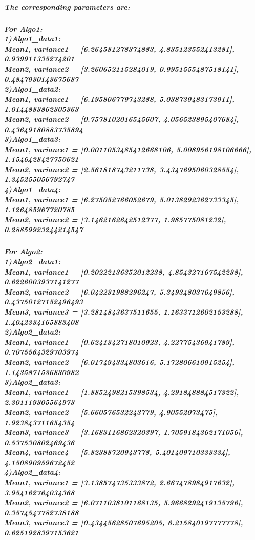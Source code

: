 \documentclass{article}
\begin{document}
\subparagraph{
The corresponding parameters are:
}
\subparagraph{
For \textit{Algo1}:\\
1)\textit{Algo1\_data1}:\\
Mean1, variance1 = [6.264581278374883, 4.835123552413281], 0.939911335274201\\
Mean2, variance2 = [3.260652115284019, 0.9951555487518141], 0.4847930143675687\\
2)\textit{Algo1\_data2}:\\
Mean1, variance1 = [6.195806779743288, 5.038739483173911], 1.0144883862305363\\
Mean2, variance2 = [0.7578102016545607, 4.056523895407684], 0.43649180883735894\\
3)\textit{Algo1\_data3}:\\
Mean1, variance1 = [0.0011053485412668106, 5.008956198106666], 1.1546428427750621\\
Mean2, variance2 = [2.561818743211738, 3.4347695060328554], 1.345255056792747\\
4)\textit{Algo1\_data4}:\\
Mean1, variance1 = [6.275052766052679, 5.0138292362733345], 1.126485967720785\\
Mean2, variance2 = [3.1462162642512377, 1.985775081232], 0.28859923244214547
}
\subparagraph{
For \textit{Algo2}:\\
1)\textit{Algo2\_data1}:\\
Mean1, variance1 = [0.20222136352012238, 4.854327167542238], 0.6226003937141277\\
Mean2, variance2 = [6.042231988296247, 5.349348037649856], 0.43750127152496493\\
Mean3, variance3 = [3.2814843637511655, 1.1633712602153288], 1.4042334165883408\\
2)\textit{Algo2\_data2}:\\
Mean1, variance1 = [0.6241342718010923, 4.22775436941789], 0.7075564329703974\\
Mean2, variance2 = [6.017494334803616, 5.172806610915254], 1.1435871536830982\\
3)\textit{Algo2\_data3}:\\
Mean1, variance1 = [1.8852498215398534, 4.291848884517322], 2.301119305564973\\
Mean2, variance2 = [5.660576532243779, 4.90552073475], 1.923843711654354\\
Mean3, variance3 = [3.1683116862320397, 1.7059184362171056], 0.537530802469436\\
Mean4, variance4 = [5.82388720943778, 5.401409710333334], 4.150890959672452\\
4)\textit{Algo2\_data4}:\\
Mean1, variance1 = [3.138574735333872, 2.667478984917632], 3.954162764034368\\
Mean2, variance2 = [6.0711038101168135, 5.9668292419135796], 0.3574547782738188\\
Mean3, variance3 = [0.43445628507695205, 6.215840197777778], 0.6251928397153621
}
\end{document}
